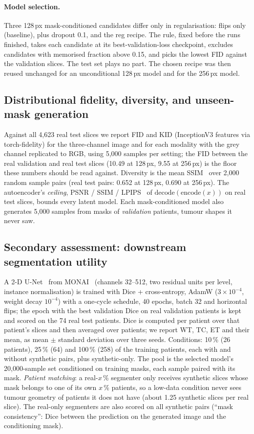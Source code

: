 \documentclass[10pt,a4paper]{article}
\begin{document}
\paragraph{Model selection.} Three 128\,px mask-conditioned candidates differ only in regularisation: flips only (baseline), plus dropout 0.1, and the reg recipe. The rule, fixed before the runs finished, takes each candidate at its best-validation-loss checkpoint, excludes candidates with memorised fraction above 0.15, and picks the lowest FID against the validation slices. The test set plays no part. The chosen recipe was then reused unchanged for an unconditional 128\,px model and for the 256\,px model.

\subsection{Distributional fidelity, diversity, and unseen-mask generation}
Against all 4,623 real test slices we report FID and KID (InceptionV3 features via torch-fidelity) for the three-channel image and for each modality with the grey channel replicated to RGB, using 5,000 samples per setting; the FID between the real validation and real test slices (10.49 at 128\,px, 9.55 at 256\,px) is the floor these numbers should be read against. Diversity is the mean SSIM~\citep{wang2004ssim} over 2,000 random sample pairs (real test pairs: 0.652 at 128\,px, 0.690 at 256\,px). The autoencoder's \emph{ceiling}, PSNR / SSIM / LPIPS~\citep{zhang2018lpips} of $\mathrm{decode}(\mathrm{encode}(x))$ on real test slices, bounds every latent model. Each mask-conditioned model also generates 5,000 samples from masks of \emph{validation} patients, tumour shapes it never saw.

\subsection{Secondary assessment: downstream segmentation utility}
\label{sec:method-seg}
A 2-D U-Net~\citep{ronneberger2015unet} from MONAI~\citep{cardoso2022monai} (channels 32--512, two residual units per level, instance normalisation) is trained with Dice + cross-entropy, AdamW ($3\times10^{-4}$, weight decay $10^{-4}$) with a one-cycle schedule, 40 epochs, batch 32 and horizontal flips; the epoch with the best validation Dice on real validation patients is kept and scored on the 74 real test patients. Dice is computed per patient over that patient's slices and then averaged over patients; we report WT, TC, ET and their mean, as mean $\pm$ standard deviation over three seeds. Conditions: 10\,\% (26 patients), 25\,\% (64) and 100\,\% (258) of the training patients, each with and without synthetic pairs, plus synthetic-only. The pool is the selected model's 20,000-sample set conditioned on training masks, each sample paired with its mask. \emph{Patient matching}: a real-$x$\,\% segmenter only receives synthetic slices whose mask belongs to one of its own $x$\,\% patients, so a low-data condition never sees tumour geometry of patients it does not have (about 1.25 synthetic slices per real slice). The real-only segmenters are also scored on all synthetic pairs (``mask consistency'': Dice between the prediction on the generated image and the conditioning mask).
\end{document}
